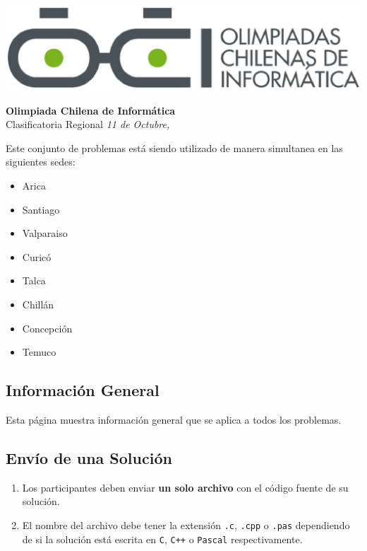 \documentclass[12pt]{oci}
\begin{document}
\begin{titlingpage}
  \begin{center}
  \includegraphics[scale=0.6]{logo.eps}

  \vskip 70pt
  \Large{\bf Olimpiada Chilena de Inform\'atica\\ \the\year}
  \vskip 10pt
  \large{Clasificatoria Regional}
  \vskip 10pt
  \normalsize{\it 11 de Octubre, \the\year}


  \vskip 95pt

  \end{center}
  Este conjunto de problemas est\'a siendo utilizado de manera simultanea en las siguientes sedes:

  \begin{itemize}[leftmargin=*]
  \item Arica
  \item Santiago
  \item Valparaiso
  \item Curic\'o
  \item Talca
  \item Chill\'an
  \item Concepci\'on
  \item Temuco
  \end{itemize}
\end{titlingpage}


\subsection*{Informaci\'on General}

Esta p\'agina muestra informaci\'on general que se aplica a todos los problemas.

\subsection*{Env\'io de una Soluci\'on}


\begin{enumerate}
\itemsep 0em
\item Los participantes deben enviar {\bf un solo archivo} con el c\'odigo fuente de su soluci\'on.
\item El nombre del archivo debe tener la extensi\'on \verb+.c+, \verb+.cpp+ o \verb+.pas+ dependiendo de si la soluci\'on est\'a escrita en \verb|C|, \verb|C++| o \verb|Pascal| respectivamente.
\end{enumerate}
\end{document}
